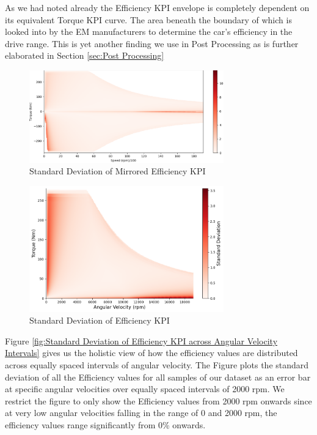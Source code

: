 \documentclass{report} %
\begin{document}
As we had noted already the Efficiency \ac{KPI} envelope is completely dependent on its equivalent Torque \ac{KPI} curve. 
The area beneath the boundary of which is looked into by the \ac{EM} manufacturers to determine the car's efficiency in the drive range.
This is yet another finding we use in Post Processing as is further elaborated in Section \ref{sec:Post Processing}

\begin{figure}[H]
    \centering
    \includegraphics[width=0.75\textwidth]{./ReportImages/stddev_y2.png} 
    \caption{Standard Deviation of Mirrored Efficiency \ac{KPI}} 
    \label{fig:Standard Deviation of Efficiency KPI(Mirrored Map)}
\end{figure}

\begin{figure}[H]
    \centering
    \includegraphics[width=0.75\textwidth]{./ReportImages/pos_stddev_y2.png} 
    \caption{Standard Deviation of Efficiency \ac{KPI}} 
    \label{fig:Standard Deviation of Efficiency KPI}
\end{figure}

Figure \ref{fig:Standard Deviation of Efficiency KPI across Angular Velocity Intervals} gives us the holistic view of how the efficiency values are 
distributed across equally spaced intervals of angular velocity. The Figure plots the standard deviation of all the Efficiency values for all samples of our dataset 
as an error bar at specific angular velocities over equally spaced intervals of 2000 rpm.
We restrict the figure to only show the Efficiency values from 2000 rpm onwards since at very low angular velocities falling in the range of 0 and 2000 rpm, the efficiency 
values range significantly from 0\% onwards.
\end{document}
